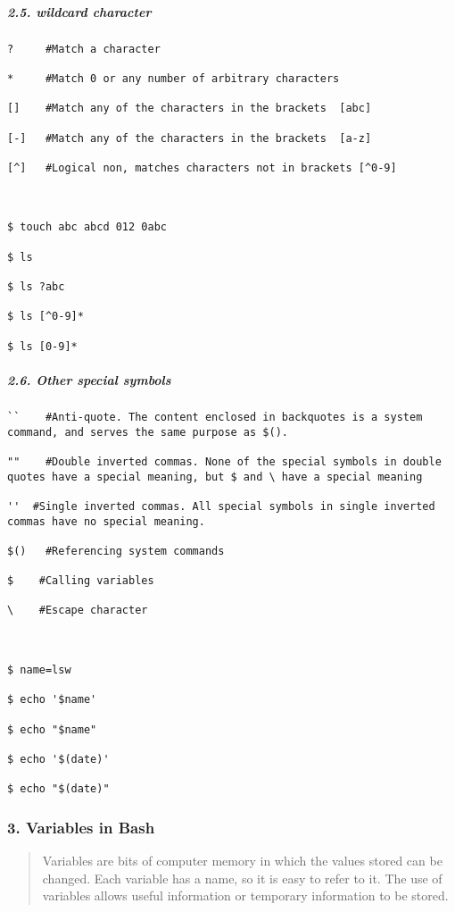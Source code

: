 \documentclass[
]{article}
\begin{document}
\hypertarget{header-n296}{%
\subparagraph{2.5. wildcard character}\label{header-n296}}

\begin{verbatim}
?     #Match a character

*     #Match 0 or any number of arbitrary characters

[]    #Match any of the characters in the brackets  [abc]

[-]   #Match any of the characters in the brackets  [a-z]

[^]   #Logical non, matches characters not in brackets [^0-9]



$ touch abc abcd 012 0abc

$ ls

$ ls ?abc

$ ls [^0-9]*

$ ls [0-9]*
\end{verbatim}

\hypertarget{header-n302}{%
\subparagraph{2.6. Other special symbols}\label{header-n302}}

\begin{verbatim}
``    #Anti-quote. The content enclosed in backquotes is a system command, and serves the same purpose as $().

""    #Double inverted commas. None of the special symbols in double quotes have a special meaning, but $ and \ have a special meaning

''  #Single inverted commas. All special symbols in single inverted commas have no special meaning.

$()   #Referencing system commands

$    #Calling variables

\    #Escape character



$ name=lsw

$ echo '$name'

$ echo "$name"

$ echo '$(date)'

$ echo "$(date)"
\end{verbatim}

\hypertarget{header-n270}{%
\subsubsection{3. Variables in Bash}\label{header-n270}}

\begin{quote}
Variables are bits of computer memory in which the values stored can be
changed. Each variable has a name, so it is easy to refer to it. The use
of variables allows useful information or temporary information to be
stored.
\end{quote}
\end{document}
